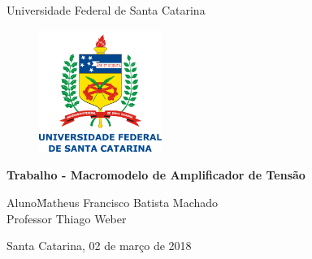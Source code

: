 \documentclass[a4paper, 12pt]{article}
\begin{document}

\begin{titlepage}
	\begin{center}
		\huge{Universidade Federal de Santa Catarina}

\vspace{10pt}
\begin{figure}[!ht]
\centering
\hspace{0cm}
\includegraphics[height=4cm, width=4cm]{ufsc-logo-2.png}
\end{figure}
        
        \vspace{85pt}
        
		\textbf{\LARGE{Trabalho - Macromodelo de Amplificador de Tensão}}
		\large{\\
        		   }
		\vspace{160pt}
		
	\end{center}
		
	\begin{flushleft}
		\begin{tabbing}
			Aluno\qquad\qquad\= Matheus Francisco Batista Machado\\
			Professor\> Thiago Weber \\
		
	\end{tabbing}
		  
	\end{flushleft}
	
	\begin{center}
		\vspace{\fill}
		Santa Catarina, 02 de março de 2018
	\end{center}
\end{titlepage}
\newpage
\tableofcontents
\thispagestyle{empty}

\newpage
{}
\end{document}
